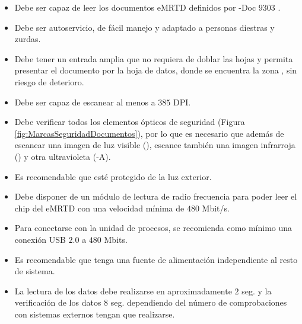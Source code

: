 \begin{itemize}
    \item
    Debe ser capaz de leer los documentos \gls{eMRTD} definidos por -Doc $9303$ \cite{doc20069303}.

    \item
    Debe ser autoservicio, de fácil manejo y adaptado a personas diestras y zurdas.

    \item
    Debe tener un entrada amplia que no requiera de doblar las hojas y permita presentar el documento por la hoja de datos, donde se encuentra la zona , sin riesgo de deterioro.

    \item
    Debe ser capaz de escanear al menos a $385$ \gls{DPI}.
    
    \item
    Debe verificar todos los elementos ópticos de seguridad (Figura \ref{fig:MarcasSeguridadDocumentos}), por lo que es necesario que además de escanear una imagen de luz visible (), escanee también una imagen infrarroja () y otra ultravioleta (-A).
    
    \item
    Es recomendable que esté protegido de la luz exterior.

    \item
    Debe disponer de un módulo de lectura de radio frecuencia para poder leer el chip del \gls{eMRTD} con una velocidad mínima de $480$ Mbit/s. 

    \item
    Para conectarse con la unidad de procesos, se recomienda como mínimo una conexión USB $2.0$ a $480$ Mbits.
    
    \item
    Es recomendable que tenga una fuente de alimentación independiente al resto de sistema.

    \item
    La lectura de los datos debe realizarse en aproximadamente $2$ seg. y la verificación de los datos $8$ seg. dependiendo del número de comprobaciones con sistemas externos tengan que realizarse.

\end{itemize}


